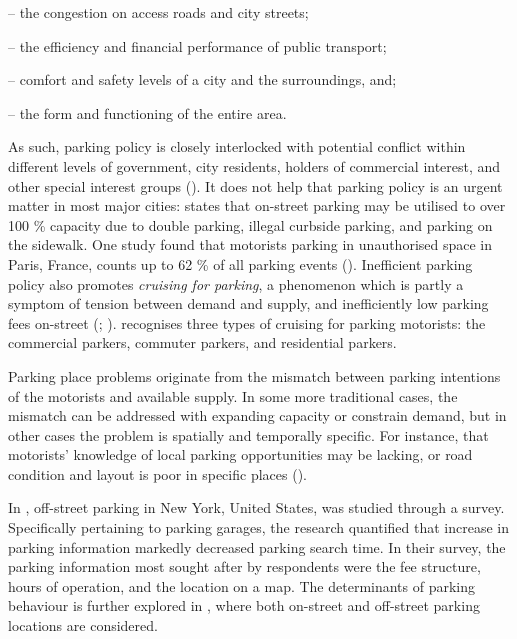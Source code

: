 \begin{itemize}
    \begin{singlespace}
        \item[--] the congestion on access roads and city streets;
        \item[--] the efficiency and financial performance of public transport;
        \item[--] comfort and safety levels of a city and the surroundings, and;
        \item[--] the form and functioning of the entire area.
    \end{singlespace}
\end{itemize}

As such, parking policy is closely interlocked with potential conflict within different levels of government, city residents, holders of commercial interest, and other special interest groups (\cite{Ker1988}). It does not help that parking policy is an urgent matter in most major cities:  states that on-street parking may be utilised to over 100 \% capacity due to double parking, illegal curbside parking, and parking on the sidewalk. One study found that motorists parking in unauthorised space in Paris, France, counts up to 62 \% of all parking events (\cite{Gantelet2006}). Inefficient parking policy also promotes \textit{cruising for parking}, a phenomenon which is partly a symptom of tension between demand and supply, and inefficiently low parking fees on-street (\cite{Shoup2004}; \citeyear{Shoup2006}).  recognises three types of cruising for parking motorists: the commercial parkers, commuter parkers, and residential parkers.

Parking place problems originate from the mismatch between parking intentions of the motorists and available supply. In some more traditional cases, the mismatch can be addressed with expanding capacity or constrain demand, but in other cases the problem is spatially and temporally specific. For instance, that motorists' knowledge of local parking opportunities may be lacking, or road condition and layout is poor in specific places (\cite{Axhausen1993}).

In , off-street parking in New York, United States, was studied through a survey. Specifically pertaining to parking garages, the research quantified that increase in parking information markedly decreased parking search time. In their survey, the parking information most sought after by respondents were the fee structure, hours of operation, and the location on a map. The determinants of parking behaviour is further explored in , where both on-street and off-street parking locations are considered.

